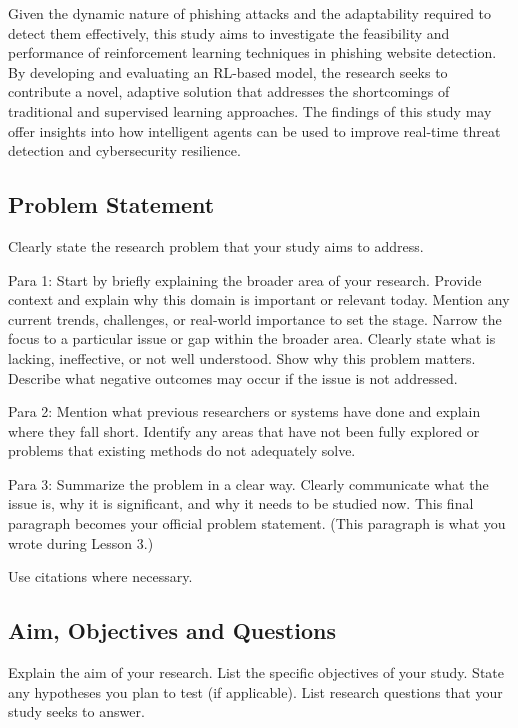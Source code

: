 Given the dynamic nature of phishing attacks and the adaptability required to detect them effectively, this study aims to investigate the feasibility and performance of reinforcement learning techniques in phishing website detection. By developing and evaluating an RL-based model, the research seeks to contribute a novel, adaptive solution that addresses the shortcomings of traditional and supervised learning approaches. The findings of this study may offer insights into how intelligent agents can be used to improve real-time threat detection and cybersecurity resilience.

\subsection{Problem Statement}
Clearly state the research problem that your study aims to address.

Para 1: Start by briefly explaining the broader area of your research. Provide context and explain why this domain is important or relevant today. Mention any current trends, challenges, or real-world importance to set the stage. Narrow the focus to a particular issue or gap within the broader area. Clearly state what is lacking, ineffective, or not well understood. Show why this problem matters. Describe what negative outcomes may occur if the issue is not addressed. 

Para 2: Mention what previous researchers or systems have done and explain where they fall short. Identify any areas that have not been fully explored or problems that existing methods do not adequately solve.

Para 3: Summarize the problem in a clear way. Clearly communicate what the issue is, why it is significant, and why it needs to be studied now. This final paragraph becomes your official problem statement. (This paragraph is what you wrote during Lesson 3.)

Use citations where necessary.

\subsection{Aim, Objectives and Questions}
Explain the aim of your research. List the specific objectives of your study. State any hypotheses you plan to test (if applicable). List research questions that your study seeks to answer.

